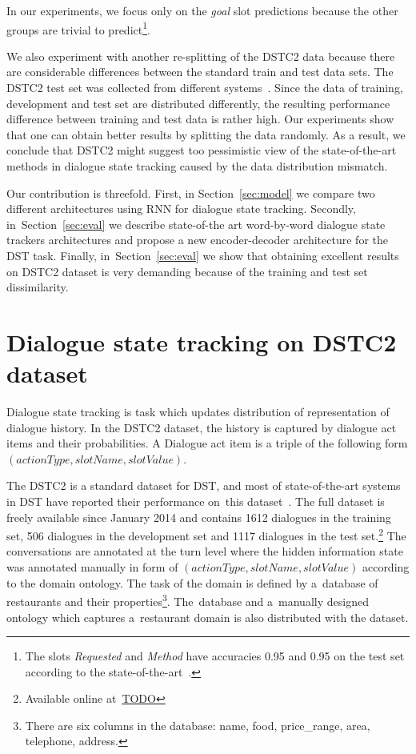 \documentclass{itatnew}
\begin{document}
In our experiments, we focus only on the {\it goal} slot predictions because the other groups are trivial to predict\footnote{The slots {\it Requested} and {\it Method} have accuracies 0.95 and 0.95 on the test set according to the state-of-the-art~\cite{williams2014web}.}.

We also experiment with another re-splitting of the DSTC2 data because there are considerable differences between the standard train and test data sets.
The DSTC2 test set was collected from different systems~\cite{henderson2014second}.
Since the data of training, development and test set are distributed differently, the resulting performance difference between training and test data is rather high.
Our experiments show that one can obtain better results by splitting the data randomly.
As a result, we conclude that DSTC2 might suggest too pessimistic view of the state-of-the-art methods in dialogue state tracking caused by the data distribution mismatch.

Our contribution is threefold. 
First, in Section~\ref{sec:model} we compare two different architectures using RNN for dialogue state tracking.
Secondly, in~Section~\ref{sec:eval} we describe state-of-the art word-by-word dialogue state trackers architectures and propose a new encoder-decoder architecture for the DST task.
Finally, in~Section~\ref{sec:eval} we show that obtaining excellent results on DSTC2 dataset is very demanding because of the training and test set dissimilarity.

\section{Dialogue state tracking on DSTC2 dataset}
Dialogue state tracking is task which updates distribution of representation of dialogue history.
In the DSTC2 dataset, the history is captured by dialogue act items and their probabilities.
A Dialogue act item is a triple of the following form $(actionType, slotName, slotValue)$.

The DSTC2 is a standard dataset for DST, and most of state-of-the-art systems in DST have reported their performance on~this dataset~\cite{henderson2014second}. 
The full dataset is freely available since January 2014 and contains 1612 dialogues in the training set, 506 dialogues in the development set and 1117 dialogues in the test set.\footnote{Available online at~\url{TODO}}
The conversations are annotated at the turn level where the hidden information state was annotated manually in form of $(actionType, slotName, slotValue)$ according to the domain ontology.
The task of the domain is defined by a~database of restaurants and their properties\footnote{There are six columns in the database: name, food, price\_range, area, telephone, address.}.
The~database and a~manually designed ontology which captures a~restaurant domain is also distributed with the dataset.
\end{document}
